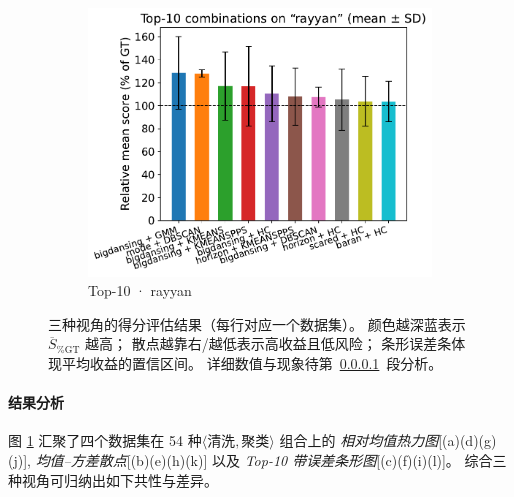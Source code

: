 \documentclass[10pt]{article} %
\numberwithin{equation}{section}
\begin{document}
\begin{figure}[htbp]
\begin{subfigure}{0.32\linewidth}
    \centering
    \includegraphics[width=\linewidth]{figures/5.3.1graph/top10_bar_error_rayyan.pdf}
    \caption{Top-10 · rayyan}
  \end{subfigure}

  \caption{三种视角的得分评估结果（每行对应一个数据集）。%
           颜色越深蓝表示 \(\overline{S}_{\%\mathrm{GT}}\) 越高；%
           散点越靠右/越低表示高收益且低风险；%
           条形误差条体现平均收益的置信区间。%
           详细数值与现象待第~\ref{sec:score_eval_exp_analysis}~段分析。}
  \label{fig:score_eval_all}
\end{figure}

\paragraph{结果分析}
\label{sec:score_eval_exp_analysis}

图 \ref{fig:score_eval_all} 汇聚了四个数据集在
54 种\(\langle\!\text{清洗},\text{聚类}\!\rangle\) 组合上的
\emph{相对均值热力图}[(a)(d)(g)(j)],
\emph{均值–方差散点}[(b)(e)(h)(k)]
以及 \emph{Top-10 带误差条形图}[(c)(f)(i)(l)]。
综合三种视角可归纳出如下共性与差异。
\end{document}
